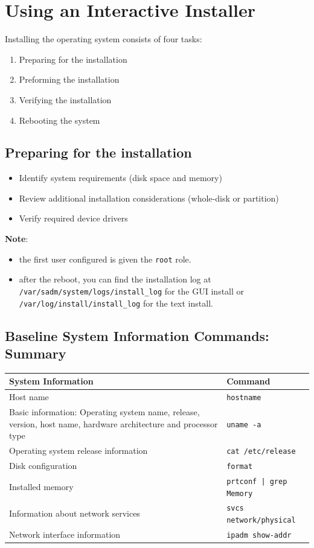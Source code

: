 \documentclass[10pt,a4paper,twoside]{report}
\begin{document}
\section{Using an Interactive Installer}
Installing the operating system consists of four tasks:
\begin{enumerate}
\item Preparing for the installation
\item Preforming the installation
\item Verifying the installation
\item Rebooting the system
\end{enumerate}
\subsection{Preparing for the installation}
\begin{itemize}
\item Identify system requirements (disk space and memory)
\item Review additional installation considerations (whole-disk or partition)
\item Verify required device drivers
\end{itemize}
\textbf{Note}:\\
\begin{itemize}
\item the first user configured is given the \verb+root+ role.
\item after the reboot, you can find the installation log at \verb+/var/sadm/system/logs/install_log+ for the GUI install or \verb+/var/log/install/install_log+ for the text install.
\end{itemize}
\subsection{Baseline System Information Commands: Summary}
\begin{table}
\begin{tabular}{|p{}|p{}|}
\hline
\rowcolor{LightBlue}
\textbf{System Information} & \textbf{Command}\\
\hline
\rowcolor{LightYellow}
Host name & \verb+hostname+\\
\hline
\rowcolor{LightYellow}
Basic information: Operating system name, release, version, host name, hardware architecture and processor type & \verb+uname -a+\\
\hline
\rowcolor{LightYellow}
Operating system release information & \verb+cat /etc/release+\\
\hline
\rowcolor{LightYellow}
Disk configuration & \verb+format+\\
\hline
\rowcolor{LightYellow}
Installed memory & \verb+prtconf | grep Memory+\\
\hline
\rowcolor{LightYellow}
Information about network services & \verb+svcs network/physical+\\
\hline
\rowcolor{LightYellow}
Network interface information & \verb+ipadm show-addr+\\
\hline
\end{tabular}
\end{table}
\end{document}

